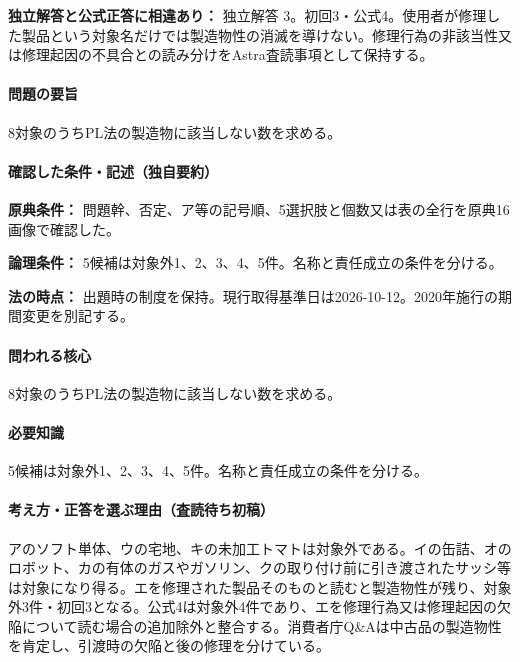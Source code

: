 \par\textbf{独立解答と公式正答に相違あり：} 独立解答 3。初回3・公式4。使用者が修理した製品という対象名だけでは製造物性の消滅を導けない。修理行為の非該当性又は修理起因の不具合との読み分けをAstra査読事項として保持する。

\paragraph{問題の要旨} 8対象のうちPL法の製造物に該当しない数を求める。

\paragraph{確認した条件・記述（独自要約）}\mbox{}\par

\noindent\textbf{原典条件：} 問題幹、否定、ア等の記号順、5選択肢と個数又は表の全行を原典16画像で確認した。\par

\noindent\textbf{論理条件：} 5候補は対象外1、2、3、4、5件。名称と責任成立の条件を分ける。\par

\noindent\textbf{法の時点：} 出題時の制度を保持。現行取得基準日は2026-10-12。2020年施行の期間変更を別記する。\par

\paragraph{問われる核心} 8対象のうちPL法の製造物に該当しない数を求める。

\paragraph{必要知識} 5候補は対象外1、2、3、4、5件。名称と責任成立の条件を分ける。

\paragraph{考え方・正答を選ぶ理由（査読待ち初稿）} アのソフト単体、ウの宅地、キの未加工トマトは対象外である。イの缶詰、オのロボット、カの有体のガスやガソリン、クの取り付け前に引き渡されたサッシ等は対象になり得る。エを修理された製品そのものと読むと製造物性が残り、対象外3件・初回3となる。公式4は対象外4件であり、エを修理行為又は修理起因の欠陥について読む場合の追加除外と整合する。消費者庁Q\&Aは中古品の製造物性を肯定し、引渡時の欠陥と後の修理を分けている。

